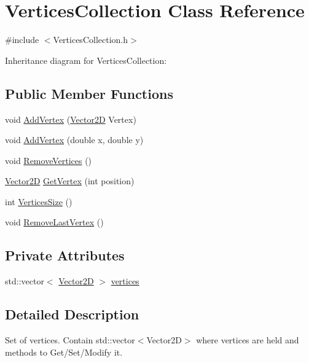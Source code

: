 \hypertarget{classVerticesCollection}{}\section{Vertices\+Collection Class Reference}
\label{classVerticesCollection}


{\ttfamily \#include $<$Vertices\+Collection.\+h$>$}



Inheritance diagram for Vertices\+Collection\+:
\subsection*{Public Member Functions}
\begin{DoxyCompactItemize}
\item 
void \hyperlink{classVerticesCollection_ad48453b9bc2a25aba1b67b51ab295b1d}{Add\+Vertex} (\hyperlink{Vector2D_8h_a2a0274942d24318d2654bd0f75c54fb7}{Vector2D} Vertex)
\item 
void \hyperlink{classVerticesCollection_afb7e83a7d84185b40ade1b2999edd108}{Add\+Vertex} (double x, double y)
\item 
void \hyperlink{classVerticesCollection_a92a341f41b621dad57b7ab74265f1a14}{Remove\+Vertices} ()
\item 
\hyperlink{Vector2D_8h_a2a0274942d24318d2654bd0f75c54fb7}{Vector2D} \hyperlink{classVerticesCollection_a8d7a19d4bd0971cc0ac81ae1b0252ef3}{Get\+Vertex} (int position)
\item 
int \hyperlink{classVerticesCollection_a357dc6b6248ad83862febe8a952abb3a}{Vertices\+Size} ()
\item 
void \hyperlink{classVerticesCollection_ad0c22e7014760ba1cf5c15230657fa81}{Remove\+Last\+Vertex} ()
\end{DoxyCompactItemize}
\subsection*{Private Attributes}
\begin{DoxyCompactItemize}
\item 
std\+::vector$<$ \hyperlink{Vector2D_8h_a2a0274942d24318d2654bd0f75c54fb7}{Vector2D} $>$ \hyperlink{classVerticesCollection_a64d15f51448714e039aa2a6abd8839cf}{vertices}
\end{DoxyCompactItemize}


\subsection{Detailed Description}
Set of vertices. Contain std\+::vector$<$\+Vector2\+D$>$ where vertices are held and methods to Get/\+Set/\+Modify it. 

